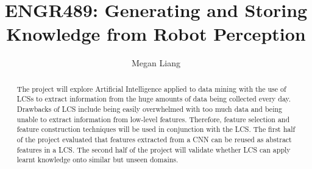 \documentclass[11pt
              , a4paper
              , twoside
              , openright
              ]{report}
\title{ENGR489: Generating and Storing Knowledge from Robot Perception}
\author{Megan Liang}
\date{}
\begin{document}
\frontmatter



\begin{abstract}

The project will explore Artificial Intelligence applied to data mining with the use of LCSs to extract information from the huge amounts of data being collected every day. Drawbacks of LCS include being easily overwhelmed with too much data and being unable to extract information from low-level features. Therefore, feature selection and feature construction techniques will be used in conjunction with the LCS. The first half of the project evaluated that features extracted from a CNN can be reused as abstract features in a LCS. The second half of the project will validate whether LCS can apply learnt knowledge onto similar but unseen domains. 

\end{abstract}


\maketitle

\tableofcontents



\mainmatter





\backmatter



%
\nocite{*}


\end{document}
